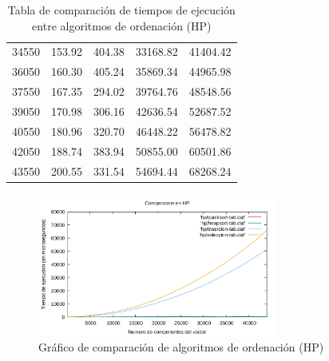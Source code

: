 \documentclass{homework}
\begin{document}
\begin{table}[H]
\begin{tabular}{|r|r|r|r|r|}
            34550 & 153.92 & 404.38 & 33168.82 & 41404.42 \\ 
            36050 & 160.30 & 405.24 & 35869.34 & 44965.98 \\ 
            37550 & 167.35 & 294.02 & 39764.76 & 48548.56 \\ 
            39050 & 170.98 & 306.16 & 42636.54 & 52687.52 \\ 
            40550 & 180.96 & 320.70 & 46448.22 & 56478.82 \\ 
            42050 & 188.74 & 383.94 & 50855.00 & 60501.86 \\ 
            43550 & 200.55 & 331.54 & 54694.44 & 68268.24 \\ 
            \hline
        \end{tabular}
        \caption{Tabla de comparación de tiempos de ejecución entre algoritmos de ordenación (HP)}
    \end{table}

    \begin{figure}[H]
        \centering
        \label{hp:orden}
        \includegraphics[width=0.7\textwidth]{../data/hp_orden-todos.pdf}
        \caption{Gráfico de comparación de algoritmos de ordenación (HP)}
    \end{figure}
\end{document}

